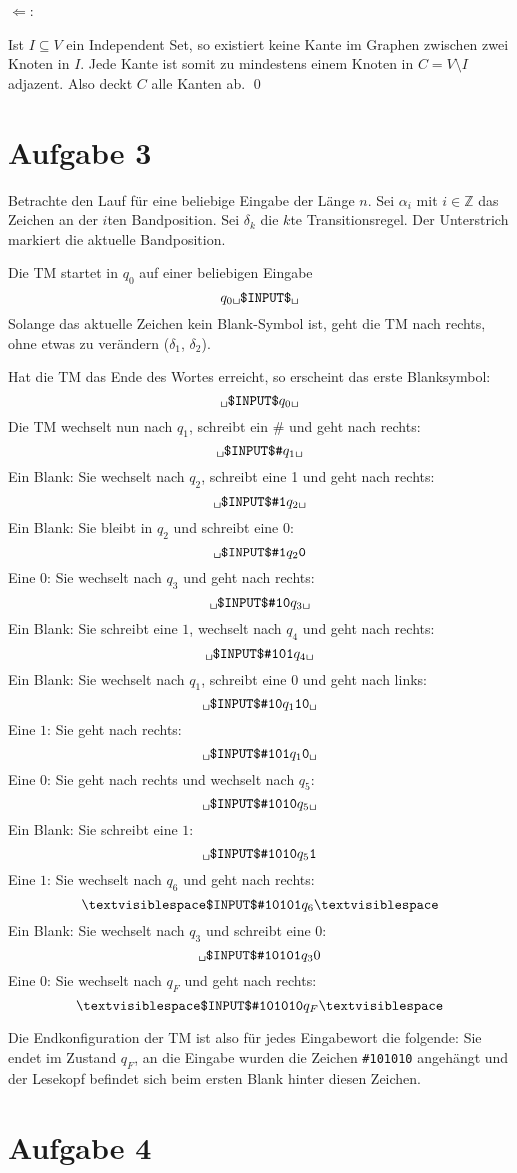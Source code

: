 \documentclass[a4paper]{article}
\newcommand{\tvs}{\textvisiblespace}
\begin{document}
$\Leftarrow$:

Ist $I \subseteq V$ ein Independent Set, so existiert keine Kante im Graphen zwischen zwei Knoten in $I$.
Jede Kante ist somit zu mindestens einem Knoten in $C = V \setminus I$ adjazent.
Also deckt $C$ alle Kanten ab.
\hfill{}\qed{}

\section{Aufgabe 3}

Betrachte den Lauf für eine beliebige Eingabe der Länge $n$.
Sei $\alpha_i$ mit $i \in \mathbb{Z}$ das Zeichen an der $i$ten Bandposition.
Sei $\delta_k$ die $k$te Transitionsregel.
Der Unterstrich markiert die aktuelle Bandposition.


Die TM startet in $q_0$ auf einer beliebigen Eingabe
\[ \texttt{$q_0$\tvs\$INPUT\$\tvs} \]
Solange das aktuelle Zeichen kein Blank-Symbol ist,
geht die TM nach rechts, ohne etwas zu verändern ($\delta_1$, $\delta_2$).

Hat die TM das Ende des Wortes erreicht, so erscheint das erste Blanksymbol:
\[ \texttt{\tvs\$INPUT\$$q_0$\tvs} \]
Die TM wechselt nun nach $q_1$, schreibt ein \# und geht nach rechts:
\[ \texttt{\tvs\$INPUT\$\#$q_1$\tvs} \]
Ein Blank: Sie wechselt nach $q_2$, schreibt eine 1 und geht nach rechts:
\[ \texttt{\tvs\$INPUT\$\#1$q_2$\tvs} \]
Ein Blank: Sie bleibt in $q_2$ und schreibt eine $0$:
\[ \texttt{\tvs\$INPUT\$\#1$q_2$0} \]
Eine $0$: Sie wechselt nach $q_3$ und geht nach rechts:
\[ \texttt{\tvs\$INPUT\$\#10$q_3$\tvs} \]
Ein Blank: Sie schreibt eine $1$, wechselt nach $q_4$ und geht nach rechts:
\[ \texttt{\tvs\$INPUT\$\#101$q_4$\tvs} \]
Ein Blank: Sie wechselt nach $q_1$, schreibt eine $0$ und geht nach links:
\[ \texttt{\tvs\$INPUT\$\#10$q_1$10\tvs} \]
Eine $1$: Sie geht nach rechts:
\[ \texttt{\tvs\$INPUT\$\#101$q_1$0\tvs} \]
Eine $0$: Sie geht nach rechts und wechselt nach $q_5$:
\[ \texttt{\tvs\$INPUT\$\#1010$q_5$\tvs} \]
Ein Blank: Sie schreibt eine $1$:
\[ \texttt{\tvs\$INPUT\$\#1010$q_5$1} \]
Eine $1$: Sie wechselt nach $q_6$ und geht nach rechts:
\[ \texttt{\tvs\$INPUT\$\#10101$q_6$}\tvs \]
Ein Blank: Sie wechselt nach $q_3$ und schreibt eine $0$:
\[ \texttt{\tvs\$INPUT\$\#10101$q_3$}0 \]
Eine $0$: Sie wechselt nach $q_F$ und geht nach rechts:
\[ \texttt{\tvs\$INPUT\$\#101010$q_F$}\tvs \]

Die Endkonfiguration der TM ist also für jedes Eingabewort die folgende:
Sie endet im Zustand $q_F$, an die Eingabe wurden die Zeichen
\texttt{\#101010} angehängt und der Lesekopf befindet sich beim ersten Blank
hinter diesen Zeichen.

\section{Aufgabe 4}
\end{document}
